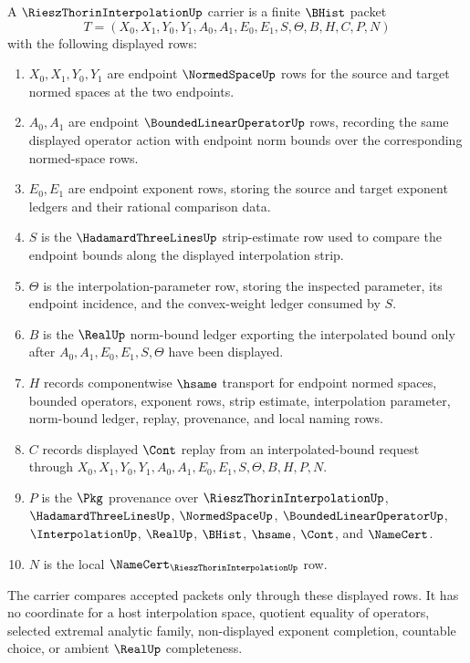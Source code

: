 \begin{definition}
\label{def:riesz-thorin-interpolation-carrier}
A $\RieszThorinInterpolationUp$ carrier is a finite $\BHist$ packet
$$
T=(X_0,X_1,Y_0,Y_1,A_0,A_1,E_0,E_1,S,\Theta,B,H,C,P,N)
$$
with the following displayed rows:
\begin{enumerate}
\item $X_0,X_1,Y_0,Y_1$ are endpoint $\NormedSpaceUp$ rows for the source and target normed spaces at the two endpoints.
\item $A_0,A_1$ are endpoint $\BoundedLinearOperatorUp$ rows, recording the same displayed operator action with endpoint norm bounds over the corresponding normed-space rows.
\item $E_0,E_1$ are endpoint exponent rows, storing the source and target exponent ledgers and their rational comparison data.
\item $S$ is the $\HadamardThreeLinesUp$ strip-estimate row used to compare the endpoint bounds along the displayed interpolation strip.
\item $\Theta$ is the interpolation-parameter row, storing the inspected parameter, its endpoint incidence, and the convex-weight ledger consumed by $S$.
\item $B$ is the $\RealUp$ norm-bound ledger exporting the interpolated bound only after $A_0,A_1,E_0,E_1,S,\Theta$ have been displayed.
\item $H$ records componentwise $\hsame$ transport for endpoint normed spaces, bounded operators, exponent rows, strip estimate, interpolation parameter, norm-bound ledger, replay, provenance, and local naming rows.
\item $C$ records displayed $\Cont$ replay from an interpolated-bound request through $X_0,X_1,Y_0,Y_1,A_0,A_1,E_0,E_1,S,\Theta,B,H,P,N$.
\item $P$ is the $\Pkg$ provenance over $\RieszThorinInterpolationUp$, $\HadamardThreeLinesUp$, $\NormedSpaceUp$, $\BoundedLinearOperatorUp$, $\InterpolationUp$, $\RealUp$, $\BHist$, $\hsame$, $\Cont$, and $\NameCert$.
\item $N$ is the local $\NameCert_{\RieszThorinInterpolationUp}$ row.
\end{enumerate}
The carrier compares accepted packets only through these displayed rows. It has no coordinate for a host interpolation space, quotient equality of operators, selected extremal analytic family, non-displayed exponent completion, countable choice, or ambient $\RealUp$ completeness.
\end{definition}


